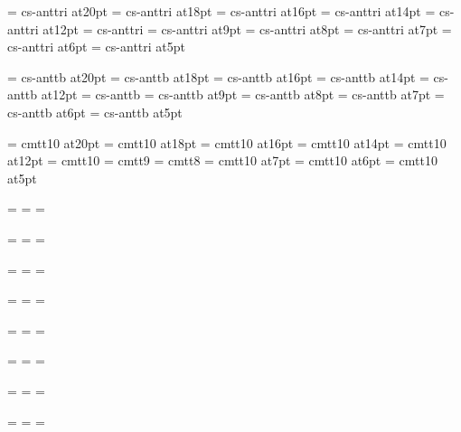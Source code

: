 \font\twentysl=     cs-anttri at20pt
\font\eighteensl=   cs-anttri at18pt
\font\sixteensl=    cs-anttri at16pt
\font\fourteensl=   cs-anttri at14pt
\font\twelvesl=     cs-anttri at12pt
\font\tensl=        cs-anttri %
\font\ninesl=       cs-anttri at9pt
\font\eightsl=      cs-anttri at8pt
\font\sevensl=      cs-anttri at7pt
\font\sixsl=        cs-anttri at6pt
\font\fivesl=       cs-anttri at5pt

\font\twentybf=     cs-anttb at20pt
\font\eighteenbf=   cs-anttb at18pt
\font\sixteenbf=    cs-anttb at16pt
\font\fourteenbf=   cs-anttb at14pt
\font\twelvebf=     cs-anttb at12pt
\font\tenbf=        cs-anttb
\font\ninebf=       cs-anttb at9pt
\font\eightbf=      cs-anttb at8pt
\font\sevenbf=      cs-anttb at7pt
\font\sixbf=        cs-anttb at6pt
\font\fivebf=       cs-anttb at5pt

\font\twentytt=     cmtt10 at20pt
\font\eighteentt=   cmtt10 at18pt
\font\sixteentt=    cmtt10 at16pt
\font\fourteentt=   cmtt10 at14pt
\font\twelvett=     cmtt10 at12pt
\font\tentt=        cmtt10
\font\ninett=       cmtt9
\font\eighttt=      cmtt8
\font\seventt=      cmtt10 at7pt
\font\sixtt=        cmtt10 at6pt
\font\fivett=       cmtt10 at5pt




=\tenrm
{}=\sevenrm
{}=\fiverm
\def\rm{\fam=0 \tenrm}

=\teni
{}=\seveni
{}=\fivei
\def\mit{\fam=1}

=\tensy
{}=\sevensy
{}=\fivesy
\def\cal{\fam=2}

=\tenex
{}=\sevenex
{}=\fiveex


\def\it{\fam=\itfam \tenit}
\textfont\itfam=\tenit
\scriptfont\itfam=\sevenit
\scriptscriptfont\itfam=\fiveit

\def\sl{\fam=\slfam \tensl}
\textfont\slfam=\tensl
\scriptfont\slfam=\sevensl
\scriptscriptfont\slfam=\fivesl

\def\bf{\fam=\bffam \tenbf}
\textfont\bffam=\tenbf
\scriptfont\bffam=\sevenbf
\scriptscriptfont\bffam=\fivebf

\def\tt{\fam=\ttfam \tentt}
\textfont\ttfam=\tentt
\scriptfont\ttfam=\seventt
\scriptscriptfont\ttfam=\fivett

